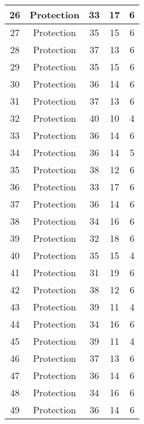 \documentclass[results.tex]{subfiles}
\begin{document}
\begin{center}
\begin{tabular}{| c || c | c | c | c |}
    \hline
    26 & Protection & 33 & 17 & 6 \\ 
    \hline
    27 & Protection & 35 & 15 & 6 \\ 
    \hline
    28 & Protection & 37 & 13 & 6 \\ 
    \hline
    29 & Protection & 35 & 15 & 6 \\ 
    \hline
    30 & Protection & 36 & 14 & 6 \\ 
    \hline
    31 & Protection & 37 & 13 & 6 \\ 
    \hline
    32 & Protection & 40 & 10 & 4 \\ 
    \hline
    33 & Protection & 36 & 14 & 6 \\ 
    \hline
    34 & Protection & 36 & 14 & 5 \\ 
    \hline
    35 & Protection & 38 & 12 & 6 \\ 
    \hline
    36 & Protection & 33 & 17 & 6 \\ 
    \hline
    37 & Protection & 36 & 14 & 6 \\ 
    \hline
    38 & Protection & 34 & 16 & 6 \\ 
    \hline
    39 & Protection & 32 & 18 & 6 \\ 
    \hline
    40 & Protection & 35 & 15 & 4 \\ 
    \hline
    41 & Protection & 31 & 19 & 6 \\ 
    \hline
    42 & Protection & 38 & 12 & 6 \\ 
    \hline
    43 & Protection & 39 & 11 & 4 \\ 
    \hline
    44 & Protection & 34 & 16 & 6 \\ 
    \hline
    45 & Protection & 39 & 11 & 4 \\ 
    \hline
    46 & Protection & 37 & 13 & 6 \\ 
    \hline
    47 & Protection & 36 & 14 & 6 \\ 
    \hline
    48 & Protection & 34 & 16 & 6 \\ 
    \hline
    49 & Protection & 36 & 14 & 6 \\ 
    \hline   \end{tabular}
\end{center}
\end{document}
